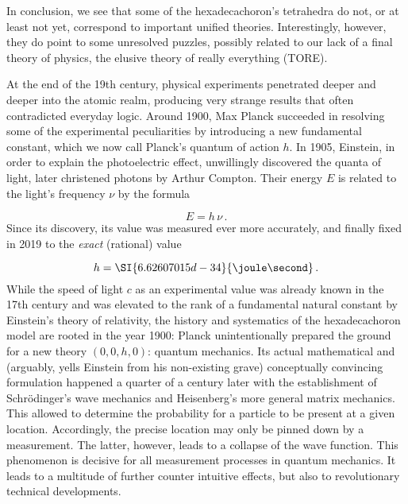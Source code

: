 \documentclass{scrartcl}
\begin{document}
In conclusion, we see that some of the hexadecachoron's tetrahedra do not, or at least not yet, correspond to important unified theories. Interestingly, however, they do point to some unresolved puzzles, possibly related to our lack of a final theory of physics, the elusive theory of really everything (TORE).




\newpage {}
\label{sec:0010}

At the end of the 19th century, physical experiments penetrated deeper and deeper into the atomic realm, producing very strange results that often contradicted everyday logic. Around 1900, Max Planck succeeded in resolving some of the experimental peculiarities by introducing a new fundamental constant, which we now call Planck's quantum of action $h$. In 1905, Einstein, in order to explain the photoelectric effect, unwillingly discovered the quanta of light, later christened photons by Arthur Compton. Their energy $E$ is related to the light's frequency $\nu$ by the formula

\begin{equation*}
  E=h\,\nu\,.
\end{equation*}
%
Since its discovery, its value was measured ever more accurately, and finally fixed in 2019 to the \emph{exact} (rational) value 

\begin{equation*}
  h=\SI{6.62607015d-34}{\joule\second}\,.
\end{equation*}
%
While the speed of light $c$ as an experimental value was already known in the 17th century and was elevated to the rank of a fundamental natural constant by Einstein's theory of relativity, the history and systematics of the hexadecachoron model are rooted in the year 1900: Planck unintentionally prepared the ground for a new theory $(0,0,h,0)$: quantum mechanics. Its actual mathematical and (arguably, yells Einstein from his non-existing grave) conceptually convincing formulation happened a quarter of a century later with the establishment of Schrödinger's wave mechanics and Heisenberg's more general matrix mechanics. This allowed to determine the probability for a particle to be present at a given location. Accordingly, the precise location may only be pinned down by a measurement. The latter, however, leads to a collapse of the wave function. This phenomenon is decisive for all measurement processes in quantum mechanics. It leads to a multitude of further counter intuitive effects, but also to revolutionary technical developments.
\end{document}

